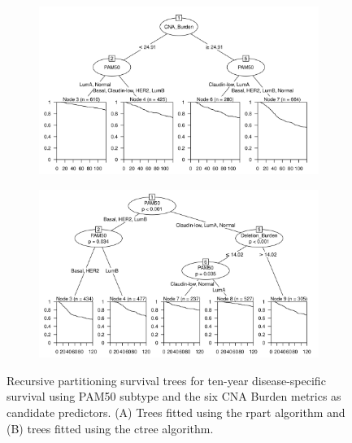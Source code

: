 \begin{figure}[!h]
\centering

\vspace{0.5cm}

\begin{subfigure}{\textwidth}
\subcaption{}
\includegraphics[width=1\textwidth]{../figures/Chapter_3/PartyKit_Survival_Burden_TenYearDSS_PAM50.png}
\end{subfigure}
\vspace{2cm}

\begin{subfigure}{\textwidth}
\subcaption{}
\includegraphics[width=1\textwidth]{../figures/Chapter_3/Ctree_Survival_Burden_TenYearDSS_PAM50.png}
\end{subfigure}
\vspace{0.5cm}

\caption[Recursive partitioning survival trees for ten-year disease-specific survival using PAM50 subtype and the six CNA Burden metrics as candidate predictors.]{Recursive partitioning survival trees for ten-year disease-specific survival using PAM50 subtype and the six CNA Burden metrics as candidate predictors. (A) Trees fitted using the rpart algorithm and (B) trees fitted using the ctree algorithm.}
\label{fig:PAM50_CNA_Burden_TenYearDSS}
\end{figure} 

